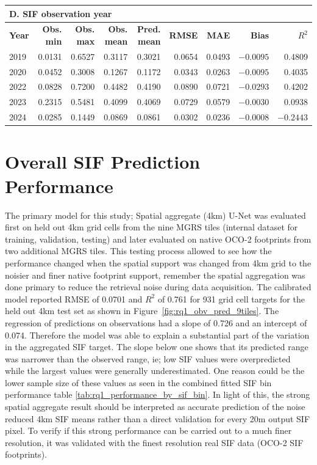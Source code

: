\begin{table}[p]
{\begin{tabular}{lrrrrrrrr}
\multicolumn{9}{l}{\textbf{D. SIF observation year}} \\
\hline
\textbf{Year} & \textbf{Obs. min} & \textbf{Obs. max} & \textbf{Obs. mean} & \textbf{Pred. mean} & \textbf{RMSE} & \textbf{MAE} & \textbf{Bias} & \textbf{$R^2$} \\
\hline
2019 & 0.0131 & 0.6527 & 0.3117 & 0.3021 & 0.0654 & 0.0493 & $-0.0095$ & 0.4809 \\
2020 & 0.0452 & 0.3008 & 0.1267 & 0.1172 & 0.0343 & 0.0263 & $-0.0095$ & 0.4035 \\
2022 & 0.0828 & 0.7200 & 0.4482 & 0.4190 & 0.0890 & 0.0721 & $-0.0293$ & 0.4202 \\
2023 & 0.2315 & 0.5481 & 0.4099 & 0.4069 & 0.0729 & 0.0579 & $-0.0030$ & 0.0938 \\
2024 & 0.0285 & 0.1449 & 0.0869 & 0.0861 & 0.0302 & 0.0236 & $-0.0008$ & $-0.2443$ \\
\hline
\end{tabular}%
}

\vspace{0.3em}
\end{table}


\section{Overall SIF Prediction Performance}

The primary model for this study; Spatial aggregate (4km) U-Net was evaluated first on held out 4km grid cells from the nine MGRS tiles (internal dataset for training, validation, testing) and later evaluated on native OCO-2 footprints from two additional MGRS tiles. This testing process allowed to see how the performance changed when the spatial support was changed from 4km grid to the noisier and finer native footprint support, remember the spatial aggregation was done primary to reduce the retrieval noise during data acquisition. The calibrated model reported RMSE of 0.0701 and $R^2$ of 0.761 for 931 grid cell targets for the held out 4km test set as shown in Figure~\ref{fig:rq1_obv_pred_9tiles}. The regression of predictions on observations had a slope of 0.726 and an intercept of 0.074. Therefore the model was able to explain a substantial part of the variation in the aggregated SIF target. The slope below one shows that its predicted range was narrower than the observed range, ie; low SIF values were overpredicted while the largest values were generally underestimated. One reason could be the lower sample size of these values as seen in the combined fitted SIF bin performance table \ref{tab:rq1_performance_by_sif_bin}. In light of this, the strong spatial aggregate result should be interpreted as accurate prediction of the noise reduced 4km SIF means rather than a direct validation for every 20m output SIF pixel. To verify if this strong performance can be carried out to a much finer resolution, it was validated with the finest resolution real SIF data (OCO-2 SIF footprints).

